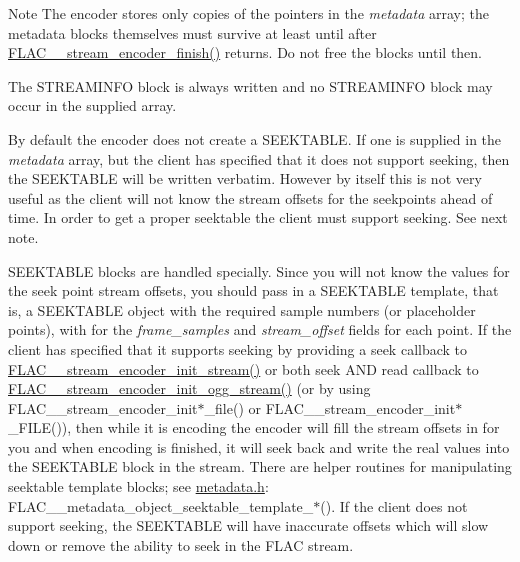 \begin{DoxyNote}{Note}
The encoder stores only copies of the pointers in the {\itshape metadata} array; the metadata blocks themselves must survive at least until after \hyperlink{group__flac__stream__encoder_gab2c1e5477c1e3fe9ad0d722ff8eecda2}{F\+L\+A\+C\+\_\+\+\_\+stream\+\_\+encoder\+\_\+finish()} returns. Do not free the blocks until then.

The S\+T\+R\+E\+A\+M\+I\+N\+FO block is always written and no S\+T\+R\+E\+A\+M\+I\+N\+FO block may occur in the supplied array.

By default the encoder does not create a S\+E\+E\+K\+T\+A\+B\+LE. If one is supplied in the {\itshape metadata} array, but the client has specified that it does not support seeking, then the S\+E\+E\+K\+T\+A\+B\+LE will be written verbatim. However by itself this is not very useful as the client will not know the stream offsets for the seekpoints ahead of time. In order to get a proper seektable the client must support seeking. See next note.

S\+E\+E\+K\+T\+A\+B\+LE blocks are handled specially. Since you will not know the values for the seek point stream offsets, you should pass in a S\+E\+E\+K\+T\+A\+B\+LE \textquotesingle{}template\textquotesingle{}, that is, a S\+E\+E\+K\+T\+A\+B\+LE object with the required sample numbers (or placeholder points), with {} for the {\itshape frame\+\_\+samples} and {\itshape stream\+\_\+offset} fields for each point. If the client has specified that it supports seeking by providing a seek callback to \hyperlink{group__flac__stream__encoder_ga85221c4ceb9f22dfd4983d8f07a9a35b}{F\+L\+A\+C\+\_\+\+\_\+stream\+\_\+encoder\+\_\+init\+\_\+stream()} or both seek A\+ND read callback to \hyperlink{group__flac__stream__encoder_ga87af71d74c09f7d482f9f420ef9bf826}{F\+L\+A\+C\+\_\+\+\_\+stream\+\_\+encoder\+\_\+init\+\_\+ogg\+\_\+stream()} (or by using F\+L\+A\+C\+\_\+\+\_\+stream\+\_\+encoder\+\_\+init$\ast$\+\_\+file() or F\+L\+A\+C\+\_\+\+\_\+stream\+\_\+encoder\+\_\+init$\ast$\+\_\+\+F\+I\+LE()), then while it is encoding the encoder will fill the stream offsets in for you and when encoding is finished, it will seek back and write the real values into the S\+E\+E\+K\+T\+A\+B\+LE block in the stream. There are helper routines for manipulating seektable template blocks; see \hyperlink{metadata_8h}{metadata.\+h}\+: F\+L\+A\+C\+\_\+\+\_\+metadata\+\_\+object\+\_\+seektable\+\_\+template\+\_\+$\ast$(). If the client does not support seeking, the S\+E\+E\+K\+T\+A\+B\+LE will have inaccurate offsets which will slow down or remove the ability to seek in the F\+L\+AC stream.


\end{DoxyNote}
